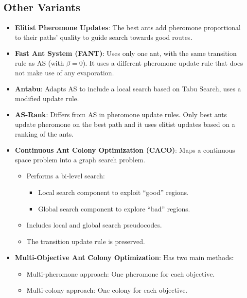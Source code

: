 \subsection*{Other Variants}
\begin{itemize}
    \item \textbf{Elitist Pheromone Updates}: The best ants add pheromone proportional to their paths' quality to guide search towards good routes.
    \item \textbf{Fast Ant System (FANT)}: Uses only one ant, with the same transition rule as AS (with $\beta=0$). It uses a different pheromone update rule that does not make use of any evaporation.
   \item \textbf{Antabu}: Adapts AS to include a local search based on Tabu Search, uses a modified update rule.
    \item \textbf{AS-Rank}: Differs from AS in pheromone update rules. Only best ants update pheromone on the best path and it uses elitist updates based on a ranking of the ants.
    \item \textbf{Continuous Ant Colony Optimization (CACO)}: Maps a continuous space problem into a graph search problem.
        \begin{itemize}
            \item Performs a bi-level search:
                \begin{itemize}
                     \item Local search component to exploit “good” regions.
                     \item Global search component to explore “bad” regions.
                \end{itemize}
            \item Includes local and global search pseudocodes.
            \item The transition update rule is preserved.
        \end{itemize}
     \item \textbf{Multi-Objective Ant Colony Optimization}: Has two main methods:
            \begin{itemize}
                 \item Multi-pheromone approach: One pheromone for each objective.
                 \item Multi-colony approach: One colony for each objective.
             \end{itemize}
\end{itemize}
